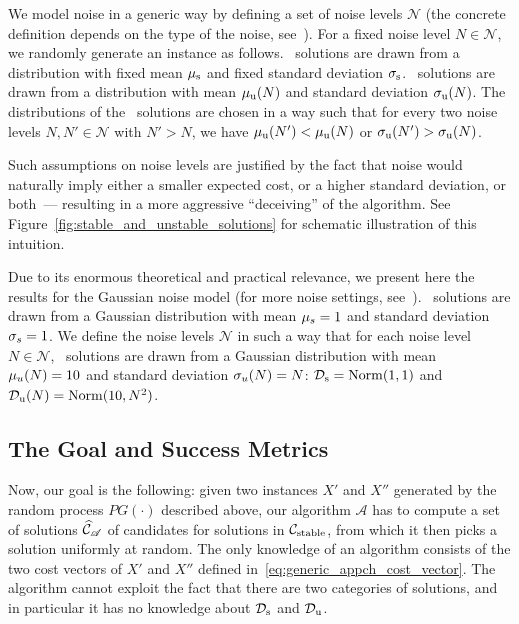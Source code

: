 We model noise in a generic way by defining a set of noise levels $\mathcal{N}$
(the concrete definition depends on the type of the noise, see~\citep{jcss:2017}). For a fixed noise
level $N\in\mathcal{N}$, we randomly generate an instance as follows. \Good\
solutions are drawn from a distribution with fixed mean $\mu_\mathrm{s}$ and fixed
standard deviation $\sigma_\mathrm{s}$.
\Bad\ solutions are drawn from a distribution with mean $\mu_\mathrm{u}(N)$ and standard
deviation $\sigma_\mathrm{u}(N)$. The distributions of the \bad\ solutions are
chosen in a way such that for every two noise levels $N,N'\in\mathcal{N}$ with
$N'>N$, we have $\mu_\mathrm{u}(N')<\mu_\mathrm{u}(N)$ or
$\sigma_\mathrm{u}(N')>\sigma_\mathrm{u}(N)$.
%

\myremark Such assumptions on noise levels are justified by the fact that noise
would naturally imply either a smaller expected cost, or a higher standard
deviation, or both~--- resulting in a more aggressive ``deceiving'' of the
algorithm. See Figure~\ref{fig:stable_and_unstable_solutions} for schematic
illustration of this intuition.

Due to its enormous theoretical and practical relevance, we present here the
results for the Gaussian noise model (for more noise settings, see~\citep{jcss:2017}).
 \Good\ solutions are drawn from a Gaussian
distribution with mean $\mu_{s}=1$ and standard deviation $\sigma_{s}=1$. We
define the noise levels $\mathcal{N}$ in such a way that for each noise level
$N\in\mathcal{N}$, \bad\ solutions are drawn from a Gaussian distribution with
mean $\mu_{u}(N)=10$ and standard deviation $\sigma_{u}(N)=N$: $\mathcal{D}_\text{s} = \mathrm{Norm}(1, 1)$ and
$\mathcal{D}_\text{u}(N) = \mathrm{Norm}(10, N^2)$.

\subsection{The Goal and Success Metrics}

Now, our goal is the following: given two instances $X'$ and $X''$ generated by
the random process $PG(\cdot)$ described above, our algorithm $\mathscr{A}$ has
to compute a set of solutions $\widehat {{\cal C}}_\mathscr{A}$ of candidates for solutions in
$\mathcal{C}_\text{stable}$, from which it then picks a solution
uniformly at random. The only knowledge of an
algorithm consists of the two cost vectors of $X'$ and $X''$ defined
in~\eqref{eq:generic_appch_cost_vector}. The algorithm cannot exploit the fact
that there are two categories of solutions, and in particular it has no
knowledge about $\mathcal{D}_\text{s}$ and $\mathcal{D}_\text{u}$.


